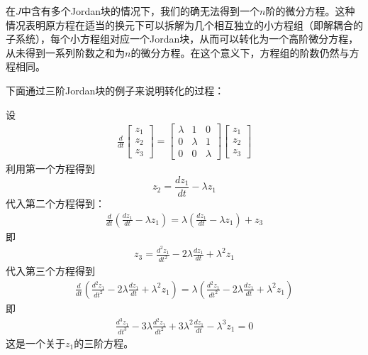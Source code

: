 在$J$中含有多个Jordan块的情况下，我们的确无法得到一个$n$阶的微分方程。这种情况表明原方程在适当的换元下可以拆解为几个相互独立的小方程组（即解耦合的子系统），每个小方程组对应一个Jordan块，从而可以转化为一个高阶微分方程，从未得到一系列阶数之和为$n$的微分方程。在这个意义下，方程组的阶数仍然与方程相同。

下面通过三阶Jordan块的例子来说明转化的过程：

\begin{example}
    设\begin{align*}
            \frac{d}{dt}\begin{bmatrix}
                z_1\\
                z_2\\
                z_3
            \end{bmatrix}=\begin{bmatrix}
            \lambda & 1 & 0\\
            0 & \lambda & 1\\
            0 & 0 & \lambda
            \end{bmatrix}\begin{bmatrix}
                z_1\\
                z_2\\
                z_3
            \end{bmatrix}
        \end{align*}
        利用第一个方程得到
        $$z_2=\frac{dz_1}{dt}-\lambda z_1$$
        代入第二个方程得到：\begin{align*}
            \frac{d}{dt}\left(\frac{dz_1}{dt}-\lambda z_1\right)=\lambda\left(\frac{dz_1}{dt}-\lambda z_1\right)+z_3
        \end{align*}
        即\begin{align*}
            z_3=\frac{d^2 z_1}{dt^2}-2\lambda\frac{dz_1}{dt}+\lambda^2 z_1
        \end{align*}
        代入第三个方程得到\begin{align*}
            \frac{d}{dt}\left(\frac{d^2 z_1}{dt^2}-2\lambda\frac{dz_1}{dt}+\lambda^2 z_1\right)=\lambda\left(\frac{d^2 z_1}{dt^2}-2\lambda\frac{dz_1}{dt}+\lambda^2 z_1\right)
        \end{align*}
        即\begin{align*}
            \frac{d^3 z_1}{dt^3}-3\lambda\frac{d^2 z_1}{dt^2}+3\lambda^2\frac{dz_1}{dt}-\lambda^3 z_1=0
        \end{align*}
        这是一个关于$z_1$的三阶方程。
\end{example}

